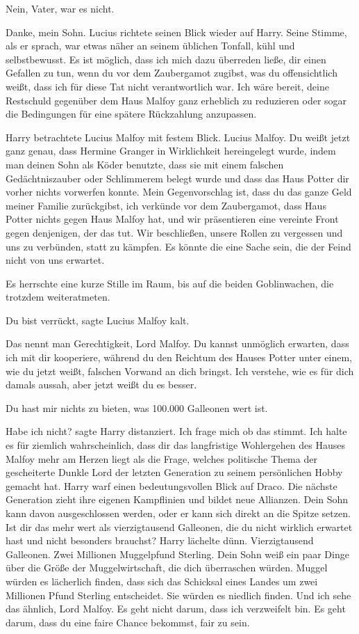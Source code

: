 \glqq{}Nein, Vater, war es nicht.\grqq{}

\glqq{}Danke, mein Sohn.\grqq{} Lucius richtete seinen Blick wieder auf Harry.
Seine Stimme, als er sprach, war etwas näher an seinem üblichen Tonfall, kühl
und selbstbewusst. \glqq{}Es ist möglich, dass ich mich dazu überreden ließe, dir
einen Gefallen zu tun, wenn du vor dem Zaubergamot zugibst, was du
offensichtlich weißt, dass ich für diese Tat nicht verantwortlich war. Ich wäre
bereit, deine Restschuld gegenüber dem Haus Malfoy ganz erheblich zu reduzieren
oder sogar die Bedingungen für eine spätere Rückzahlung anzupassen.\grqq{}

Harry betrachtete Lucius Malfoy mit festem Blick. \glqq{}Lucius Malfoy. Du weißt
jetzt ganz genau, dass Hermine Granger in Wirklichkeit hereingelegt wurde, indem
man deinen Sohn als Köder benutzte, dass sie mit einem falschen Gedächtniszauber
oder Schlimmerem belegt wurde und dass das Haus Potter dir vorher nichts
vorwerfen konnte. Mein Gegenvorschlag ist, dass du das ganze Geld meiner Familie
zurückgibst, ich verkünde vor dem Zaubergamot, dass Haus Potter nichts gegen
Haus Malfoy hat, und wir präsentieren eine vereinte Front gegen denjenigen, der
das tut. Wir beschließen, unsere Rollen zu vergessen und uns zu verbünden, statt
zu kämpfen. Es könnte die eine Sache sein, die der Feind nicht von uns
erwartet.\grqq{}

Es herrschte eine kurze Stille im Raum, bis auf die beiden Goblinwachen, die
trotzdem weiteratmeten.

\glqq{}Du bist verrückt\grqq{}, sagte Lucius Malfoy kalt.

\glqq{}Das nennt man Gerechtigkeit, Lord Malfoy. Du kannst unmöglich erwarten,
dass ich mit dir kooperiere, während du den Reichtum des Hauses Potter unter
einem, wie du jetzt weißt, falschen Vorwand an dich bringst. Ich verstehe, wie
es für dich damals aussah, aber jetzt weißt du es besser.\grqq{}

\glqq{}Du hast mir nichts zu bieten, was 100.000 Galleonen wert ist.\grqq{}

\glqq{}Habe ich nicht?\grqq{} sagte Harry distanziert. \glqq{}Ich frage mich ob
das stimmt. Ich halte es für ziemlich wahrscheinlich, dass dir das langfristige
Wohlergehen des Hauses Malfoy mehr am Herzen liegt als die Frage, welches
politische Thema der gescheiterte Dunkle Lord der letzten Generation zu seinem
persönlichen Hobby gemacht hat.\grqq{} Harry warf einen bedeutungsvollen Blick
auf Draco. \glqq{}Die nächste Generation zieht ihre eigenen Kampflinien und
bildet neue Allianzen. Dein Sohn kann davon ausgeschlossen werden, oder er kann
sich direkt an die Spitze setzen. Ist dir das mehr wert als vierzigtausend
Galleonen, die du nicht wirklich erwartet hast und nicht besonders
brauchst?\grqq{} Harry lächelte dünn. \glqq{}Vierzigtausend Galleonen. Zwei
Millionen Muggelpfund Sterling. Dein Sohn weiß ein paar Dinge über die Größe der
Muggelwirtschaft, die dich überraschen würden. Muggel würden es lächerlich
finden, dass sich das Schicksal eines Landes um zwei Millionen Pfund Sterling
entscheidet. Sie würden es niedlich finden. Und ich sehe das ähnlich, Lord
Malfoy. Es geht nicht darum, dass ich verzweifelt bin. Es geht darum, dass du
eine faire Chance bekommst, fair zu sein.\grqq{}

